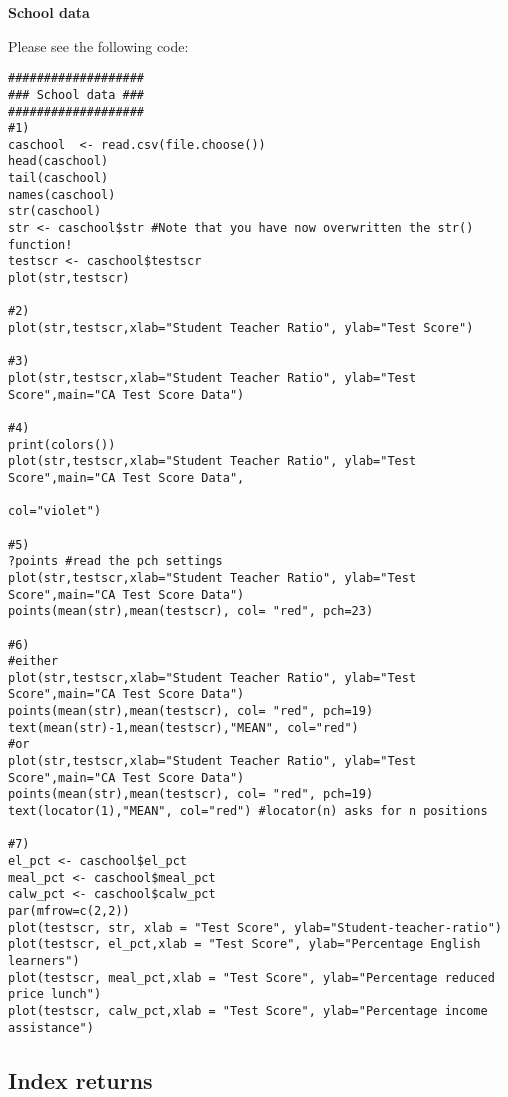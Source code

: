 \documentclass{article}
\begin{document}
\begin{solution}
\textbf{School data }

Please see the following code:
\begin{verbatim}
###################
### School data ###
###################
#1)
caschool  <- read.csv(file.choose())
head(caschool)
tail(caschool)
names(caschool)
str(caschool)
str <- caschool$str #Note that you have now overwritten the str() function!
testscr <- caschool$testscr
plot(str,testscr)

#2)
plot(str,testscr,xlab="Student Teacher Ratio", ylab="Test Score")

#3)
plot(str,testscr,xlab="Student Teacher Ratio", ylab="Test Score",main="CA Test Score Data")

#4)
print(colors())
plot(str,testscr,xlab="Student Teacher Ratio", ylab="Test Score",main="CA Test Score Data",
                                                                                col="violet")

#5)
?points #read the pch settings
plot(str,testscr,xlab="Student Teacher Ratio", ylab="Test Score",main="CA Test Score Data")
points(mean(str),mean(testscr), col= "red", pch=23)

#6)
#either
plot(str,testscr,xlab="Student Teacher Ratio", ylab="Test Score",main="CA Test Score Data")
points(mean(str),mean(testscr), col= "red", pch=19)
text(mean(str)-1,mean(testscr),"MEAN", col="red")
#or
plot(str,testscr,xlab="Student Teacher Ratio", ylab="Test Score",main="CA Test Score Data")
points(mean(str),mean(testscr), col= "red", pch=19)
text(locator(1),"MEAN", col="red") #locator(n) asks for n positions

#7)
el_pct <- caschool$el_pct
meal_pct <- caschool$meal_pct
calw_pct <- caschool$calw_pct
par(mfrow=c(2,2))
plot(testscr, str, xlab = "Test Score", ylab="Student-teacher-ratio")
plot(testscr, el_pct,xlab = "Test Score", ylab="Percentage English learners")
plot(testscr, meal_pct,xlab = "Test Score", ylab="Percentage reduced price lunch")
plot(testscr, calw_pct,xlab = "Test Score", ylab="Percentage income assistance")
\end{verbatim}
\end{solution}

\subsection{Index returns}
\end{document}
